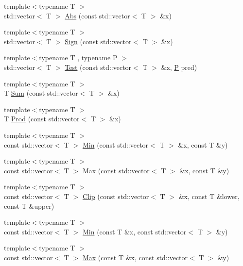 \begin{DoxyCompactItemize}
{\footnotesize template$<$typename T $>$ }\\std\+::vector$<$ T $>$ \hyperlink{contrafold_2_utilities_8ipp_ab937f6ab2d41fa4dfbeb67b8d3be0a5e}{Abs} (const std\+::vector$<$ T $>$ \&x)
\item 
{\footnotesize template$<$typename T $>$ }\\std\+::vector$<$ T $>$ \hyperlink{contrafold_2_utilities_8ipp_ad703b4b46a29bf917575e22f84d8d199}{Sign} (const std\+::vector$<$ T $>$ \&x)
\item 
{\footnotesize template$<$typename T , typename P $>$ }\\std\+::vector$<$ T $>$ \hyperlink{contrafold_2_utilities_8ipp_af04cb7317628b0438926fb652ac41e2d}{Test} (const std\+::vector$<$ T $>$ \&x, \hyperlink{pf__duplex_8c_a54f9e847235c2061dfd403c5869b5e2d}{P} pred)
\item 
{\footnotesize template$<$typename T $>$ }\\T \hyperlink{contrafold_2_utilities_8ipp_a727bddb8389af19f389a42b5117a7328}{Sum} (const std\+::vector$<$ T $>$ \&x)
\item 
{\footnotesize template$<$typename T $>$ }\\T \hyperlink{contrafold_2_utilities_8ipp_a7ad28d2b759a85d7d7ad2b1839965f11}{Prod} (const std\+::vector$<$ T $>$ \&x)
\item 
{\footnotesize template$<$typename T $>$ }\\const std\+::vector$<$ T $>$ \hyperlink{contrafold_2_utilities_8ipp_afb34320e7191fcfe6a715bdebcbdc00c}{Min} (const std\+::vector$<$ T $>$ \&x, const T \&y)
\item 
{\footnotesize template$<$typename T $>$ }\\const std\+::vector$<$ T $>$ \hyperlink{contrafold_2_utilities_8ipp_af841c8c9a54b2630ae1358106e935d53}{Max} (const std\+::vector$<$ T $>$ \&x, const T \&y)
\item 
{\footnotesize template$<$typename T $>$ }\\const std\+::vector$<$ T $>$ \hyperlink{contrafold_2_utilities_8ipp_a288a761be65529c192ec9789756c48e2}{Clip} (const std\+::vector$<$ T $>$ \&x, const T \&lower, const T \&upper)
\item 
{\footnotesize template$<$typename T $>$ }\\const std\+::vector$<$ T $>$ \hyperlink{contrafold_2_utilities_8ipp_af4d253c4343fceb20b2c92bbcff8badd}{Min} (const T \&x, const std\+::vector$<$ T $>$ \&y)
\item 
{\footnotesize template$<$typename T $>$ }\\const std\+::vector$<$ T $>$ \hyperlink{contrafold_2_utilities_8ipp_a5f6f45fe7c9e63a2596082df4dddee75}{Max} (const T \&x, const std\+::vector$<$ T $>$ \&y)

\end{DoxyCompactItemize}
